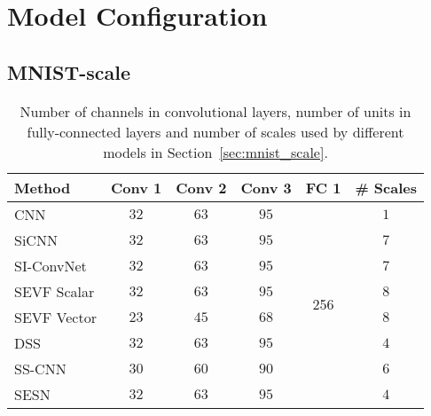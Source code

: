 \documentclass{article} \usepackage{multirow}
\def\Secref#1{Section~\ref{#1}}
\begin{document}
\newpage
\section{Model Configuration}
\subsection{MNIST-scale}
\begin{table}[h]
    \begin{center}
    \begin{tabular}{l|cccc|c}
    \toprule
    Method                & Conv 1 & Conv 2 & Conv 3 & FC 1                 & \multicolumn{1}{c}{\# Scales}              \\ 
    \midrule
    CNN                   & $32$     & $63$     & $95$     & \multirow{8}{*}{256} & $1$                                               \\
    SiCNN                 & $32$     & $63$     & $95$     &                      & $7$        \\
    SI-ConvNet                & $32$     & $63$     & $95$     &                      & $7$        \\
    SEVF Scalar           & $32$     & $63$     & $95$     &                      & $8$     \\
    SEVF Vector           & $23$     & $45$     & $68$     &                      & $8$     \\
    DSS                   & $32$     & $63$     & $95$     &                      & $4$                   \\
    SS-CNN                & $30$     & $60$     & $90$     &                      & $6$                                                \\
    SESN                  & $32$     & $63$     & $95$     &                      & $4$                                              \\       
    \bottomrule                             
    \end{tabular}
    \end{center}
    \caption{Number of channels in convolutional layers, number of units in fully-connected layers 
    and number of scales used by different models in \Secref{sec:mnist_scale}.}
    \label{tab:appendix_arch_mnist}
\end{table}
\end{document}
